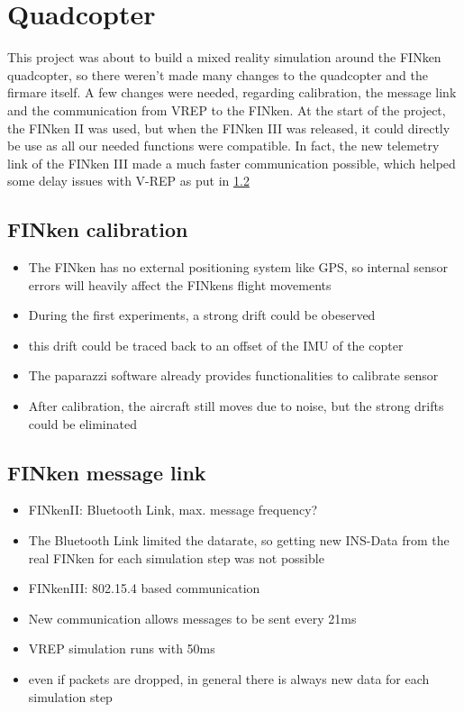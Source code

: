 \section{Quadcopter}

This project was about to build a mixed reality simulation around the FINken quadcopter, so there weren't made many changes to the quadcopter and the firmare itself. A few changes were needed, regarding calibration, the message link and the communication from VREP to the FINken. At the start of the project, the FINken II was used, but when the FINken III was released, it could directly be use as all our needed functions were compatible. In fact, the new telemetry link of the FINken III made a much faster communication possible, which helped some delay issues with V-REP as put in \ref{sec:messLink}
\subsection{FINken calibration}
\begin{itemize}
\item{The FINken has no external positioning system like GPS, so internal sensor errors will heavily affect the FINkens flight movements}
\item{During the first experiments, a strong drift could be obeserved}
\item{this drift could be traced back to an offset of the IMU of the copter }
\item{The paparazzi software already provides functionalities to calibrate sensor }
\item{After calibration, the aircraft still moves due to noise, but the strong drifts could be eliminated}
\end{itemize}
\subsection{FINken message link}
\label{sec:messLink}
\begin{itemize}
\item{FINkenII: Bluetooth Link, max. message frequency?}
\item{The Bluetooth Link limited the datarate, so getting new INS-Data from the real FINken for each simulation step was not possible}
\item{FINkenIII: 802.15.4 based communication}
\item{New communication allows messages to be sent every 21ms}
\item{VREP simulation runs with 50ms}
\item{even if packets are dropped, in general there is always new data for each simulation step}
\end{itemize}
